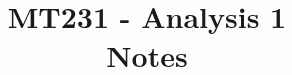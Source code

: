 \documentclass[12pt]{article} %
\title{
    \vspace{2in}
        \textmd{\textbf{MT231 - Analysis 1}}\\
    \vspace{1in}
    \textmd{\textbf{Notes}}\\
    \vspace{1in}
}
\date{}
\begin{document}
\maketitle

\pagebreak

\tableofcontents

\pagebreak


\end{document}
